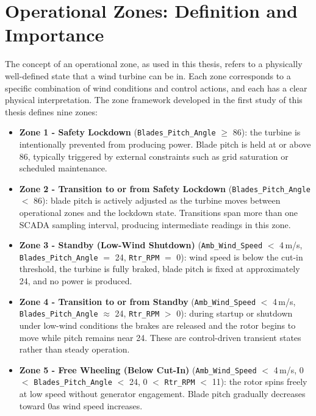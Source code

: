 \section{Operational Zones: Definition and Importance}
\label{sec:intro:zones}

The concept of an operational zone, as used in this thesis, refers to a physically
well-defined state that a wind turbine can be in. Each zone corresponds to a specific
combination of wind conditions and control actions, and each has a clear physical
interpretation. The zone framework developed in the first study of this thesis \citep{indrekvam2026}
defines nine zones:

\begin{itemize}
  \item \textbf{Zone 1 - Safety Lockdown}
        (\texttt{Blades\_Pitch\_Angle} $\geq$ 86\textdegree):
        the turbine is intentionally prevented from producing power. Blade pitch is held
        at or above 86\textdegree, typically triggered by external constraints such as
        grid saturation or scheduled maintenance.

  \item \textbf{Zone 2 - Transition to or from Safety Lockdown}
        (\texttt{Blades\_Pitch\_Angle} $<$ 86\textdegree):
        blade pitch is actively adjusted as the turbine moves between operational zones
        and the lockdown state. Transitions span more than one SCADA sampling interval,
        producing intermediate readings in this zone.

  \item \textbf{Zone 3 - Standby (Low-Wind Shutdown)}
        (\texttt{Amb\_Wind\_Speed} $<$ 4\,m/s,
         \texttt{Blades\_Pitch\_Angle} $=$ 24\textdegree,
         \texttt{Rtr\_RPM} $=$ 0):
        wind speed is below the cut-in threshold, the turbine is fully braked, blade
        pitch is fixed at approximately 24\textdegree, and no power is produced.

  \item \textbf{Zone 4 - Transition to or from Standby}
        (\texttt{Amb\_Wind\_Speed} $<$ 4\,m/s,
         \texttt{Blades\_Pitch\_Angle} $\approx$ 24\textdegree,
         \texttt{Rtr\_RPM} $>$ 0):
        during startup or shutdown under low-wind conditions the brakes are released and
        the rotor begins to move while pitch remains near 24\textdegree. These are
        control-driven transient states rather than steady operation.

  \item \textbf{Zone 5 - Free Wheeling (Below Cut-In)}
        (\texttt{Amb\_Wind\_Speed} $<$ 4\,m/s,
         0\textdegree $<$ \texttt{Blades\_Pitch\_Angle} $<$ 24\textdegree,
         0 $<$ \texttt{Rtr\_RPM} $<$ 11):
        the rotor spins freely at low speed without generator engagement. Blade pitch
        gradually decreases toward 0\textdegree as wind speed increases.


\end{itemize}
